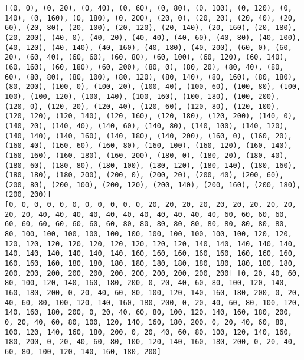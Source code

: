 \documentclass[11pt]{article}
\begin{document}
    \begin{Verbatim}[commandchars=\\\{\}]
[(0, 0), (0, 20), (0, 40), (0, 60), (0, 80), (0, 100), (0, 120), (0, 140), (0, 160), (0, 180), (0, 200), (20, 0), (20, 20), (20, 40), (20, 60), (20, 80), (20, 100), (20, 120), (20, 140), (20, 160), (20, 180), (20, 200), (40, 0), (40, 20), (40, 40), (40, 60), (40, 80), (40, 100), (40, 120), (40, 140), (40, 160), (40, 180), (40, 200), (60, 0), (60, 20), (60, 40), (60, 60), (60, 80), (60, 100), (60, 120), (60, 140), (60, 160), (60, 180), (60, 200), (80, 0), (80, 20), (80, 40), (80, 60), (80, 80), (80, 100), (80, 120), (80, 140), (80, 160), (80, 180), (80, 200), (100, 0), (100, 20), (100, 40), (100, 60), (100, 80), (100, 100), (100, 120), (100, 140), (100, 160), (100, 180), (100, 200), (120, 0), (120, 20), (120, 40), (120, 60), (120, 80), (120, 100), (120, 120), (120, 140), (120, 160), (120, 180), (120, 200), (140, 0), (140, 20), (140, 40), (140, 60), (140, 80), (140, 100), (140, 120), (140, 140), (140, 160), (140, 180), (140, 200), (160, 0), (160, 20), (160, 40), (160, 60), (160, 80), (160, 100), (160, 120), (160, 140), (160, 160), (160, 180), (160, 200), (180, 0), (180, 20), (180, 40), (180, 60), (180, 80), (180, 100), (180, 120), (180, 140), (180, 160), (180, 180), (180, 200), (200, 0), (200, 20), (200, 40), (200, 60), (200, 80), (200, 100), (200, 120), (200, 140), (200, 160), (200, 180), (200, 200)]
[0, 0, 0, 0, 0, 0, 0, 0, 0, 0, 0, 20, 20, 20, 20, 20, 20, 20, 20, 20, 20, 20, 40, 40, 40, 40, 40, 40, 40, 40, 40, 40, 40, 60, 60, 60, 60, 60, 60, 60, 60, 60, 60, 60, 80, 80, 80, 80, 80, 80, 80, 80, 80, 80, 80, 100, 100, 100, 100, 100, 100, 100, 100, 100, 100, 100, 120, 120, 120, 120, 120, 120, 120, 120, 120, 120, 120, 140, 140, 140, 140, 140, 140, 140, 140, 140, 140, 140, 160, 160, 160, 160, 160, 160, 160, 160, 160, 160, 160, 180, 180, 180, 180, 180, 180, 180, 180, 180, 180, 180, 200, 200, 200, 200, 200, 200, 200, 200, 200, 200, 200] [0, 20, 40, 60, 80, 100, 120, 140, 160, 180, 200, 0, 20, 40, 60, 80, 100, 120, 140, 160, 180, 200, 0, 20, 40, 60, 80, 100, 120, 140, 160, 180, 200, 0, 20, 40, 60, 80, 100, 120, 140, 160, 180, 200, 0, 20, 40, 60, 80, 100, 120, 140, 160, 180, 200, 0, 20, 40, 60, 80, 100, 120, 140, 160, 180, 200, 0, 20, 40, 60, 80, 100, 120, 140, 160, 180, 200, 0, 20, 40, 60, 80, 100, 120, 140, 160, 180, 200, 0, 20, 40, 60, 80, 100, 120, 140, 160, 180, 200, 0, 20, 40, 60, 80, 100, 120, 140, 160, 180, 200, 0, 20, 40, 60, 80, 100, 120, 140, 160, 180, 200]

    \end{Verbatim}
\end{document}
